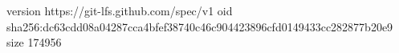version https://git-lfs.github.com/spec/v1
oid sha256:dc63cdd08a04287cca4bfef38740c46c904423896cfd0149433cc282877b20e9
size 174956
